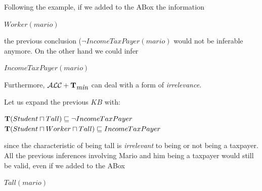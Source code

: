 \documentclass[a4paper, 11pt, oneside]{duthesis}
\newcommand{\tip}{{\bf T}}
\newcommand{\alctmin}{\mathcal{ALC}+\tip_{\mbox{\em min}}}
\begin{document}
Following the example, if we added to the ABox the information
\begin{center}$Worker(mario)$\end{center}
the previous conclusion ($\neg IncomeTaxPayer(mario)$ would not be inferable anymore. On the other hand we could infer
\begin{center}$IncomeTaxPayer(mario)$\end{center}

Furthermore, $\alctmin$ can deal with a form of \emph{irrelevance}.

Let us expand the previous $KB$ with:
\begin{center}
$\tip(Student \sqcap Tall) \sqsubseteq \neg IncomeTaxPayer$\\
$\tip(Student \sqcap Worker \sqcap Tall) \sqsubseteq IncomeTaxPayer$
\end{center}
since the characteristic of being tall is \emph{irrelevant} to being or not being a taxpayer. All the previous inferences involving Mario and him being a taxpayer would still be valid, even if we added to the ABox
\begin{center}
$Tall(mario)$
\end{center}

\newpage


%
\end{document}
